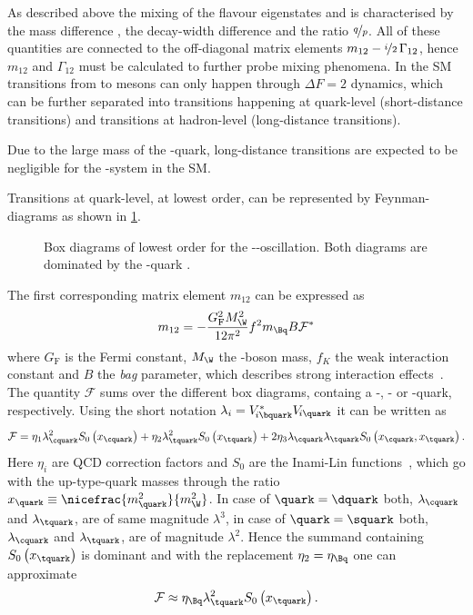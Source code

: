 As described above the mixing of the flavour eigenstates \Bq and \Bqb is characterised by the mass difference \dm, the decay-width difference \DG and the ratio $\nicefrac{q}{p}$.
All of these quantities are connected to the off-diagonal matrix elements $m_{12}-\nicefrac{i}{2}\,\Gamma_{12}$, hence $m_{12}$ and $\Gamma_{12}$ must be calculated to further probe mixing phenomena.
In the \ac{SM} transitions from \Bq to \Bqb mesons can only happen through $\Delta F=2$ dynamics, which can be further separated into transitions happening at quark-level (short-distance transitions) and transitions at hadron-level (long-distance transitions).

Due to the large mass of the \bquark-quark, long-distance transitions are expected to be negligible for the \Bq-\Bqb system in the \ac{SM}.

Transitions at quark-level, at lowest order, can be represented by Feynman-diagrams as shown in \cref{fig:FeynmanMixing}.
\begin{figure}[tbp]
	\centering
	
	\hspace{0.5cm}
	
	\caption{Box diagrams of lowest order for the \Bz-\Bzb-oscillation. Both diagrams are dominated by the \tquark-quark \cite{Ellis:2016jkw}.}
	\label{fig:FeynmanMixing}
\end{figure}
The first corresponding matrix element $m_{12}$ can be expressed as
\begin{equation}
m_{12}=-\frac{G_{\text{F}}^2M_\W^2}{12\pi^2}f^2m_{\Bq}B\mathcal{F}^\ast \label{eq:monetwo}
\end{equation}
where $G_{\text{F}}$ is the Fermi constant, $M_\W$ the \W-boson mass, $f_K$ the weak interaction constant and $B$ the \emph{bag} parameter, which describes strong interaction effects~\cite{Branco:396964}.
The quantity $\mathcal{F}$ sums over the different box diagrams, containg a \uquark-, \cquark- or \tquark-quark, respectively.
Using the short notation $\lambda_i=V^{*}_{{\kern -0.1em}i\bquark}V_{{\kern -0.1em}i\quark}$ it can be written as
\begin{equation}
\mathcal{F}=\eta_1\lambda_\cquark^2S_0\left(x_\cquark\right)+\eta_2\lambda_\tquark^2S_0\left(x_\tquark\right)
+2\eta_3\lambda_{\cquark}\lambda_{\tquark}S_0\left(x_\cquark,x_\tquark\right).
\end{equation}
Here $\eta_i$ are QCD correction factors and $S_0$ are the Inami-Lin functions~\cite{Inami:1980fz}, which go with the up-type-quark masses through the ratio $x_\quark\equiv\nicefrac{m_\quark^2}{m_\W^2}$.
In case of $\quark=\dquark$ both, $\lambda_\cquark$ and $\lambda_\tquark$, are of same magnitude $\lambda^3$, in case of $\quark=\squark$ both, $\lambda_\cquark$ and $\lambda_\tquark$, are of magnitude $\lambda^2$.
Hence the summand containing $S_0\left(x_\tquark\right)$ is dominant and with the replacement $\eta_2=\eta_\Bq$ one can approximate
\begin{equation}
\mathcal{F}\approx\eta_\Bq\lambda_\tquark^2S_0\left(x_\tquark\right).
\end{equation}


